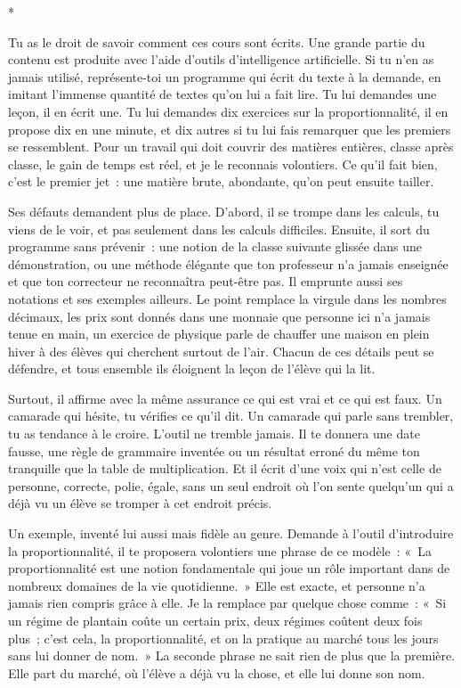 \documentclass[10.5pt,twoside,openright]{book}
\newcommand{\asterisme}{\par\vspace{0.7em}\centerline{\color{gris}*\quad*\quad*}\vspace{0.7em}\par\noindent}
\begin{document}
\asterisme

Tu as le droit de savoir comment ces cours sont écrits. Une grande partie du contenu est produite avec l’aide d’outils d’intelligence artificielle. Si tu n’en as jamais utilisé, représente-toi un programme qui écrit du texte à la demande, en imitant l’immense quantité de textes qu’on lui a fait lire. Tu lui demandes une leçon, il en écrit une. Tu lui demandes dix exercices sur la proportionnalité, il en propose dix en une minute, et dix autres si tu lui fais remarquer que les premiers se ressemblent. Pour un travail qui doit couvrir des matières entières, classe après classe, le gain de temps est réel, et je le reconnais volontiers. Ce qu’il fait bien, c’est le premier jet : une matière brute, abondante, qu’on peut ensuite tailler.

Ses défauts demandent plus de place. D’abord, il se trompe dans les calculs, tu viens de le voir, et pas seulement dans les calculs difficiles. Ensuite, il sort du programme sans prévenir : une notion de la classe suivante glissée dans une démonstration, ou une méthode élégante que ton professeur n’a jamais enseignée et que ton correcteur ne reconnaîtra peut-être pas. Il emprunte aussi ses notations et ses exemples ailleurs. Le point remplace la virgule dans les nombres décimaux, les prix sont donnés dans une monnaie que personne ici n’a jamais tenue en main, un exercice de physique parle de chauffer une maison en plein hiver à des élèves qui cherchent surtout de l’air. Chacun de ces détails peut se défendre, et tous ensemble ils éloignent la leçon de l’élève qui la lit.

Surtout, il affirme avec la même assurance ce qui est vrai et ce qui est faux. Un camarade qui hésite, tu vérifies ce qu’il dit. Un camarade qui parle sans trembler, tu as tendance à le croire. L’outil ne tremble jamais. Il te donnera une date fausse, une règle de grammaire inventée ou un résultat erroné du même ton tranquille que la table de multiplication. Et il écrit d’une voix qui n’est celle de personne, correcte, polie, égale, sans un seul endroit où l’on sente quelqu’un qui a déjà vu un élève se tromper à cet endroit précis.

Un exemple, inventé lui aussi mais fidèle au genre. Demande à l’outil d’introduire la proportionnalité, il te proposera volontiers une phrase de ce modèle : « La proportionnalité est une notion fondamentale qui joue un rôle important dans de nombreux domaines de la vie quotidienne. » Elle est exacte, et personne n’a jamais rien compris grâce à elle. Je la remplace par quelque chose comme : « Si un régime de plantain coûte un certain prix, deux régimes coûtent deux fois plus ; c’est cela, la proportionnalité, et on la pratique au marché tous les jours sans lui donner de nom. » La seconde phrase ne sait rien de plus que la première. Elle part du marché, où l’élève a déjà vu la chose, et elle lui donne son nom.
\end{document}
